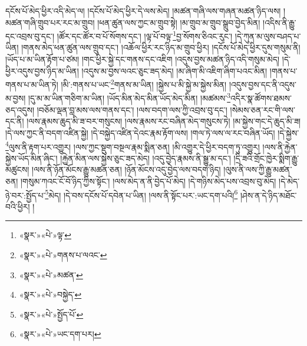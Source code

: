 དངོས་པོ་མེད་ཕྱིར་འདི་མེད་ལ། །དངོས་པོ་མེད་ཕྱིར་དེ་ལས་མེད། །མཚན་གཞི་ལས་གཞན་མཚན་ཉིད་ལས། །མཚན་གཞི་གྲུབ་པར་རང་མ་གྲུབ། །ཕན་ཚུན་ལས་ཀྱང་མ་གྲུབ་སྟེ། །མ་གྲུབ་མ་གྲུབ་སྒྲུབ་བྱེད་མིན། །འདིས་ནི་རྒྱུ་དང་འབྲས་བུ་དང་། །ཚོར་དང་ཚོར་བ་པོ་སོགས་དང་། །ལྟ་པོ་བལྟ་\footnote{«སྣར་»«པེ་»ལྟ་}བྱ་སོགས་ཅིའང་རུང་། །དེ་ཀུན་མ་ལུས་བཤད་པ་ཡིན། །གནས་མེད་ཕན་ཚུན་ལས་གྲུབ་དང་། །འཆོལ་ཕྱིར་རང་ཉིད་མ་གྲུབ་ཕྱིར། །དངོས་པོ་མེད་ཕྱིར་དུས་གསུམ་ནི། །ཡོད་པ་མ་ཡིན་རྟོག་པ་ཙམ། །གང་ཕྱིར་སྐྱེ་དང་གནས་དང་འཇིག །འདུས་བྱས་མཚན་ཉིད་འདི་གསུམ་མེད། །དེ་ཕྱིར་འདུས་བྱས་ཉིད་མ་ཡིན། །འདུས་མ་བྱས་ལའང་ཅུང་ཟད་མེད། །མ་ཞིག་མི་འཇིག་ཞིག་པའང་མིན། །གནས་པ་གནས་པ་མ་ཡིན་ཏེ། །མི་:གནས་པ་ཡང་\footnote{«སྣར་»«པེ་»གནས་པ་ལའང་}གནས་མ་ཡིན། །སྐྱེས་པ་མི་སྐྱེ་མ་སྐྱེས་མིན། །འདུས་བྱས་དང་ནི་འདུས་མ་བྱས། །དུ་མ་མ་ཡིན་གཅིག་མ་ཡིན། །ཡོད་མིན་མེད་མིན་ཡོད་མེད་མིན། །མཚམས་\footnote{«སྣར་»«པེ་»མཚན་}འདིར་སྣ་ཚོགས་ཐམས་ཅད་འདུས། །བཅོམ་ལྡན་བླ་མས་ལས་གནས་དང་། །ལས་བདག་ལས་ཀྱི་འབྲས་བུ་དང་། །སེམས་ཅན་རང་གི་ལས་དང་ནི། །ལས་རྣམས་ཆུད་མི་ཟ་བར་གསུངས། །ལས་རྣམས་རང་བཞིན་མེད་གསུངས་ཏེ། །མ་སྐྱེས་གང་དེ་ཆུད་མི་ཟ། །དེ་ལས་ཀྱང་ནི་བདག་འཛིན་སྐྱེ། །དེ་བསྐྱེད་འཛིན་དེའང་རྣམ་རྟོག་ལས། །གལ་ཏེ་ལས་ལ་རང་བཞིན་ཡོད། །དེ་སྐྱེས་\footnote{«སྣར་»«པེ་»བསྐྱེད་}ལུས་ནི་རྟག་པར་འགྱུར། །ལས་ཀྱང་སྡུག་བསྔལ་རྣམ་སྨིན་ཅན། །མི་འགྱུར་དེ་ཕྱིར་བདག་ཏུ་འགྱུར། །ལས་ནི་རྐྱེན་སྐྱེས་ཡོད་མིན་ཞིང་། །རྐྱེན་མིན་ལས་སྐྱེས་ཅུང་ཟད་མེད། །འདུ་བྱེད་རྣམས་ནི་སྒྱུ་མ་དང་། །དྲི་ཟའི་གྲོང་ཁྱེར་སྨིག་རྒྱུ་མཚུངས། །ལས་ནི་ཉོན་མོངས་རྒྱུ་མཚན་ཅན། །ཉོན་མོངས་འདུ་བྱེད་ལས་བདག་ཉིད། །ལུས་ནི་ལས་ཀྱི་རྒྱུ་མཚན་ཅན། །གསུམ་ཀའང་ངོ་བོ་ཉིད་ཀྱིས་སྟོང་། །ལས་མེད་ན་ནི་བྱེད་པོ་མེད། །དེ་གཉིས་མེད་པས་འབྲས་བུ་མེད། །དེ་མེད་ཉེ་བར་:སྤྱོད་པ་\footnote{«སྣར་»«པེ་»སྤྱོད་པོ་}མེད། །དེ་བས་དངོས་པོ་དབེན་པ་ཡིན། །ལས་ནི་སྟོང་པར་:ཡང་དག་པའི།\footnote{«སྣར་»«པེ་»ཡང་དག་པར།} །ཤེས་ན་དེ་ཉིད་མཐོང་བའི་ཕྱིར། །
